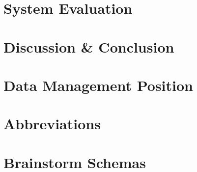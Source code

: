 \documentclass[a4paper]{report}
\begin{document}
	
	
	
	
	
	
	
	
	\chapter{System Evaluation}
	\label{evaluation}
	
	
	
	
	\chapter{Discussion \& Conclusion}
	\label{discussion}
	
	
	
	
	
	
	
	\chapter{Data Management Position}
	\label{position}
	
	
	
	
	
	
	
	
	
	\clearpage
	
	
	\appendix
	\chapter{Abbreviations}
	\label{abbreviations}
	
	
	
	\chapter{Brainstorm Schemas}
	\label{brainstorm-before-after}
	
\end{document}
